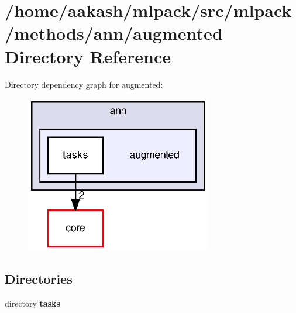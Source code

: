 \section{/home/aakash/mlpack/src/mlpack/methods/ann/augmented Directory Reference}
\label{dir_f7eb35bd2a2c96949cb799a06f21eb7a}
Directory dependency graph for augmented\+:
\nopagebreak
\begin{figure}[H]
\begin{center}
\leavevmode
\includegraphics[width=230pt]{dir_f7eb35bd2a2c96949cb799a06f21eb7a_dep}
\end{center}
\end{figure}
\subsection*{Directories}
\begin{DoxyCompactItemize}
\item 
directory \textbf{ tasks}
\end{DoxyCompactItemize}

